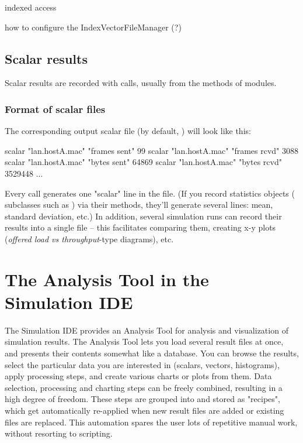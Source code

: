 indexed access

how to configure the IndexVectorFileManager (?)


\subsection{Scalar results}
\label{sec:ch-ana-sim:output-scalars}

Scalar results are recorded with  calls,
usually from the  methods of modules.


\subsubsection{Format of scalar files}

The corresponding output scalar file (by default, )
will look like this:

\begin{filelisting}
scalar "lan.hostA.mac" "frames sent"                99
scalar "lan.hostA.mac" "frames rcvd"                3088
scalar "lan.hostA.mac" "bytes sent"                 64869
scalar "lan.hostA.mac" "bytes rcvd"                 3529448
...
\end{filelisting}

Every  call generates one "scalar" line in the file.
(If you record statistics objects ( subclasses
such as ) via their  methods,
they'll generate several lines: mean, standard deviation, etc.)
In addition, several simulation runs can record their results into a single file --
this facilitates comparing them, creating x-y plots
(\textit{offered load vs throughput}-type diagrams), etc.



\section{The Analysis Tool in the Simulation IDE}

The Simulation IDE provides an Analysis Tool for analysis and visualization
of simulation results. The Analysis Tool lets you load several result files
at once, and presents their contents somewhat like a database. You can
browse the results, select the particular data you are interested in
(scalars, vectors, histograms), apply processing steps, and create various
charts or plots from them. Data selection, processing and charting steps
can be freely combined, resulting in a high degree of freedom.
These steps are grouped into and stored as "recipes", which get automatically
re-applied when new result files are added or existing files are
replaced. This automation spares the user lots of repetitive manual work,
without resorting to scripting.

